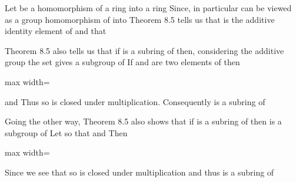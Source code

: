 \documentclass[11pt,oneside]{article}
\begin{document}
\begin{BookBody}
 Let \BookInline{\phi } be a homomorphism of a ring  into a ring  Since, in particular\BookInline{,\allowbreak \phi } can be viewed as a group homomorphism of  into  Theorem 8.5 tells us that  is the additive identity element of  and that 

Theorem 8.5 also tells us that if  is a subring of  then, considering the additive group  the set \BookInline{\langle \phi [S],\allowbreak + ^{\prime }\rangle } gives a subgroup of  If  and  are two elements of \BookInline{\phi [S],\allowbreak } then

\begin{center}\begin{adjustbox}{max width=\linewidth}\end{adjustbox}\end{center}

\noindent and  Thus  so \BookInline{\phi [S]} is closed under multiplication. Consequently\BookInline{,\allowbreak \phi [S]} is a subring of 

Going the other way, Theorem 8.5 also shows that if  is a subring of  then  is a subgroup of  Let  so that  and  Then

\begin{center}\begin{adjustbox}{max width=\linewidth}\end{adjustbox}\end{center}

\noindent Since  we see that  so  is closed under multiplication and thus is a subring of 


\end{BookBody}
\end{document}
